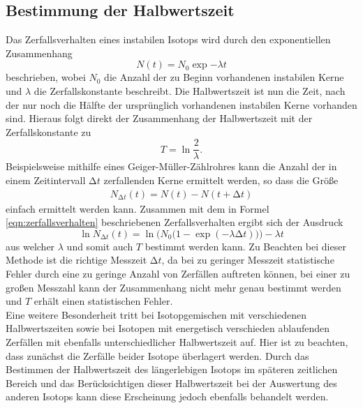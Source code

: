 \subsection{Bestimmung der Halbwertszeit}
Das Zerfallsverhalten eines instabilen Isotops wird durch den exponentiellen Zusammenhang
\begin{equation}
  N(t) = N_0 \exp{-\lambda t}
  \label{eqn:zerfallsverhalten}
\end{equation}
beschrieben, wobei $N_0$ die Anzahl der zu Beginn vorhandenen instabilen Kerne und $\lambda$ die Zerfallskonstante beschreibt.
Die Halbwertszeit ist nun die Zeit, nach der nur noch die Hälfte der ursprünglich vorhandenen instabilen Kerne vorhanden sind.
Hieraus folgt direkt der Zusammenhang der Halbwertszeit mit der Zerfallskonstante zu
\begin{equation}
  T = \ln{\frac{2}{\lambda}}.
\end{equation}
Beispielsweise mithilfe eines Geiger-Müller-Zählrohres kann die Anzahl der in einem Zeitintervall $\increment t$ zerfallenden Kerne ermittelt werden, so dass die Größe
\begin{align*}
  N_{\increment t}(t) = N(t) - N(t + \increment t)
\end{align*}
einfach ermittelt werden kann.
Zusammen mit dem in Formel \eqref{eqn:zerfallsverhalten} beschriebenen Zerfallsverhalten ergibt sich der Ausdruck
\begin{equation}
  \ln{ N_{\increment t}}(t) = \ln{\bigl( N_0 (1- \exp{(-\lambda \increment t)}} )\bigr) - \lambda t
\end{equation}
aus welcher $\lambda$ und somit auch $T$ bestimmt werden kann.
Zu Beachten bei dieser Methode ist die richtige Messzeit $\increment t$, da bei zu geringer Messzeit statistische Fehler durch eine zu geringe Anzahl von Zerfällen auftreten können, bei einer zu großen Messzahl kann der Zusammenhang nicht mehr genau bestimmt werden und $T$ erhält einen statistischen Fehler.\\
Eine weitere Besonderheit tritt bei Isotopgemischen mit verschiedenen Halbwertszeiten sowie bei Isotopen mit energetisch verschieden ablaufenden Zerfällen mit ebenfalls unterschiedlicher Halbwertszeit auf.
Hier ist zu beachten, dass zunächst die Zerfälle beider Isotope überlagert werden.
Durch das Bestimmen der Halbwertszeit des längerlebigen Isotops im späteren zeitlichen Bereich und das Berücksichtigen dieser Halbwertszeit bei der Auswertung des anderen Isotops kann diese Erscheinung jedoch ebenfalls behandelt werden.


